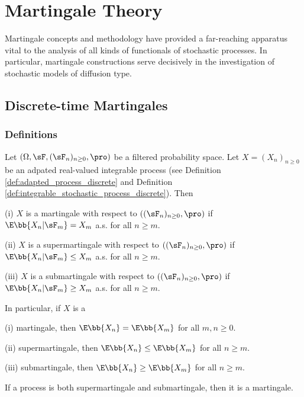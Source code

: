 \chapter{Martingale Theory}

Martingale concepts and methodology have provided a far-reaching apparatus vital to the analysis of all kinds of functionals of stochastic processes. In particular, martingale constructions serve decisively in the investigation of stochastic models of diffusion type.\cite{Karlin_Taylor_1975}

\section{Discrete-time Martingales}

\subsection{Definitions}

\begin{definition}\label{def:martingale_super_sub_discrete}
Let $(\Omega,\sF, (\sF_n)_{n\geq 0},\pro)$ be a filtered probability space. Let $X = (X_n)_{n\geq 0}$ be an adpated real-valued integrable process (see Definition \ref{def:adapted_process_discrete} and Definition \ref{def:integrable_stochastic_process_discrete}). Then
\ben
\item [(i)] $X$ is a martingale with respect to $((\sF_n)_{n\geq 0},\pro)$ if $\E\bb{X_n | \sF_m} = X_m$ a.s. for all $n \geq m$.
\item [(ii)] $X$ is a supermartingale with respect to $((\sF_n)_{n\geq 0},\pro)$ if $\E\bb{X_n | \sF_m}\leq X_m$ a.s. for all $n\geq m$.
\item [(iii)] $X$ is a submartingale with respect to $((\sF_n)_{n\geq 0},\pro)$ if $\E\bb{X_n | \sF_m} \geq X_m$ a.s. for all $n\geq m$.
\een

In particular, if $X$ is a
\ben
\item [(i)] martingale, then $\E\bb{X_n} = \E\bb{X_m}$ for all $m,n\geq 0$.
\item [(ii)] supermartingale, then $\E\bb{X_n} \leq \E\bb{X_m}$ for all $n\geq m$.
\item [(iii)] submartingale, then $\E\bb{X_n} \geq \E\bb{X_m}$ for all $n\geq m$.
\een
\end{definition}

\begin{remark}
If a process is both supermartingale and submartingale, then it is a martingale.
\end{remark}



